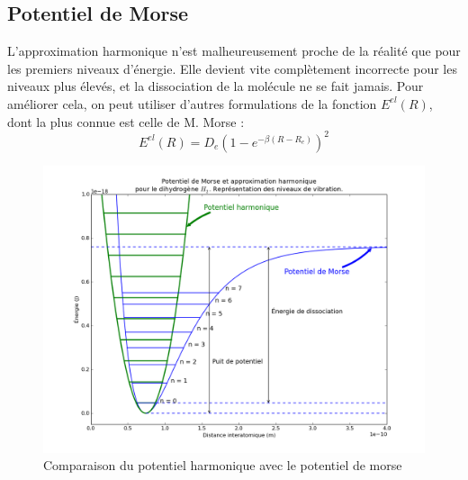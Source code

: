 \subsection{Potentiel de Morse}

L'approximation harmonique n'est malheureusement proche de la réalité que pour les premiers niveaux d'énergie. Elle devient vite complètement incorrecte pour les niveaux plus élevés, et la dissociation de la molécule ne se fait jamais. Pour améliorer cela, on peut utiliser d'autres formulations de la fonction $E^{el}(R)$, dont la plus connue est celle de M. Morse : 
\begin{equation*}
    E^{el}(R) = D_e(1-e^{-\beta(R-R_e)})^2
\end{equation*}

\begin{figure}[ht]\label{fig:Morse}
    \centering
    \includegraphics[scale=0.45]{Images3/potentiel_morse-04.png}
    \caption{Comparaison du potentiel harmonique avec le potentiel de morse}
\end{figure}

